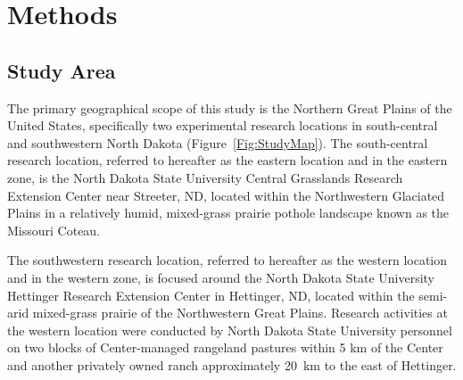 \documentclass[fire,article,accept,oneauthor,pdftex]{Definitions/mdpi}
\begin{document}
 
\section{Methods %
} 

\subsection{Study Area}

The primary geographical scope of this study is the Northern Great Plains of the United States, specifically two experimental research locations in south-central and southwestern North Dakota (Figure~\ref{Fig:StudyMap}). 
The south-central research location, referred to hereafter as the eastern location and in the eastern zone, is the North Dakota State University Central Grasslands Research Extension Center near Streeter, ND, located within the Northwestern Glaciated Plains in a relatively humid, mixed-grass prairie pothole landscape known as the Missouri Coteau. 

The southwestern research location, referred to hereafter as the western location and in the western zone, is focused around the North Dakota State University Hettinger Research Extension Center in Hettinger, ND, located within the semi-arid mixed-grass prairie of the Northwestern Great Plains. 
Research activities at the western location were conducted by North Dakota State University personnel on two blocks of Center-managed rangeland pastures within 5 km of the Center and another privately owned ranch approximately 20~km to the east of Hettinger.
\end{document}
